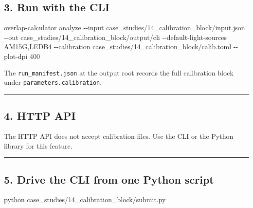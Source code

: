 \documentclass[
  11pt,
]{article}
\newenvironment{Shaded}{}{}
\newcommand{\AttributeTok}[1]{\textcolor[rgb]{0.49,0.56,0.16}{#1}}
\newcommand{\ExtensionTok}[1]{#1}
\newcommand{\NormalTok}[1]{#1}
\begin{document}
\hypertarget{3-run-with-the-cli}{
\subsection{3. Run with the CLI}\label{3-run-with-the-cli}}

\begin{Shaded}
\begin{Highlighting}[]
\ExtensionTok{overlap{-}calculator}\NormalTok{ analyze }\AttributeTok{{-}{-}input}\NormalTok{ case\_studies/14\_calibration\_block/input.json }\AttributeTok{{-}{-}out}\NormalTok{ case\_studies/14\_calibration\_block/output/cli }\AttributeTok{{-}{-}default{-}light{-}sources}\NormalTok{ AM15G,LEDB4 }\AttributeTok{{-}{-}calibration}\NormalTok{ case\_studies/14\_calibration\_block/calib.toml }\AttributeTok{{-}{-}plot{-}dpi}\NormalTok{ 400}
\end{Highlighting}
\end{Shaded}

The \texttt{run\_manifest.json} at the output root records the full
calibration block under \texttt{parameters.calibration}.

\begin{center}\rule{0.5\linewidth}{0.5pt}\end{center}

\hypertarget{4-http-api}{
\subsection{4. HTTP API}\label{4-http-api}}

The HTTP API does not accept calibration files. Use the CLI or the
Python library for this feature.

\begin{center}\rule{0.5\linewidth}{0.5pt}\end{center}

\hypertarget{5-drive-the-cli-from-one-python-script}{
\subsection{5. Drive the CLI from one Python
script}\label{5-drive-the-cli-from-one-python-script}}

\begin{Shaded}
\begin{Highlighting}[]
\ExtensionTok{python}\NormalTok{ case\_studies/14\_calibration\_block/submit.py}
\end{Highlighting}
\end{Shaded}
\end{document}
